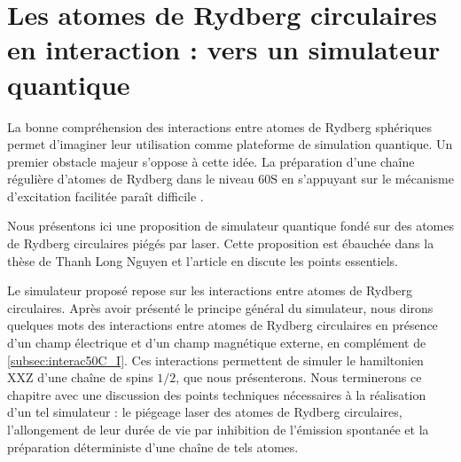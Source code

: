 \chapter{Les atomes de Rydberg circulaires en interaction : vers un simulateur quantique}
\label{chapter:circsim}

\noindent La bonne compréhension des interactions entre atomes de Rydberg sphériques permet d'imaginer leur utilisation comme plateforme de simulation quantique.
Un premier obstacle majeur s'oppose à cette idée.
La préparation d'une chaîne régulière d'atomes de Rydberg dans le niveau $\mathrm{60S}$ en s'appuyant sur le mécanisme d'excitation facilitée paraît difficile \cite{PHD_NGUYEN}.

Nous présentons ici une proposition de simulateur quantique fondé sur des atomes de Rydberg circulaires piégés par laser.
Cette proposition est ébauchée dans la thèse de Thanh Long Nguyen \cite{PHD_NGUYEN} et l'article \cite{ENS_PRE_CIRCSIM} en discute les points essentiels.

Le simulateur proposé repose sur les interactions entre atomes de Rydberg circulaires.
Après avoir présenté le principe général du simulateur, nous dirons quelques mots des interactions entre atomes de Rydberg circulaires en présence d'un champ électrique et d'un champ magnétique externe, en complément de \ref{subsec:interac50C_I}.
Ces interactions permettent de simuler le hamiltonien \og XXZ \fg{} d'une chaîne de spins $1/2$, que nous présenterons.
Nous terminerons ce chapitre avec une discussion des points techniques nécessaires à la réalisation d'un tel simulateur : le piégeage laser des atomes de Rydberg circulaires, l'allongement de leur durée de vie par inhibition de l'émission spontanée et la préparation déterministe d'une chaîne de tels atomes.

